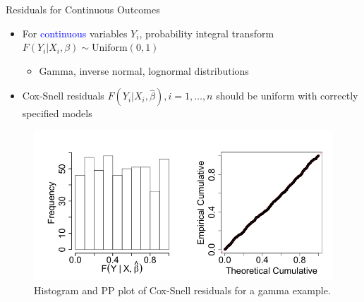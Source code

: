 \documentclass[
  ignorenonframetext,
]{beamer}
\begin{document}
\begin{frame}{Residuals for Continuous Outcomes}
\protect\hypertarget{residuals-for-continuous-outcomes}{}
\begin{itemize}
    
    \item For \textcolor{blue}{continuous} variables $Y_i$, 
probability integral transform $F(Y_i|X_i,\beta)\sim \mathrm{Uniform}(0,1)$
\begin{itemize}
\item Gamma, inverse normal, lognormal distributions
\end{itemize}
\item Cox-Snell residuals  $F(Y_i|X_i,\hat{\beta}),i=1,\ldots,n$ should be uniform with correctly specified models
\end{itemize}
\vspace{-0.4in}
\begin{figure}[h]
\includegraphics[width=.8\textwidth]{figures/continuous}
\caption{Histogram and PP plot of Cox-Snell  residuals for a gamma example. }
\end{figure}
\end{frame}
\end{document}
